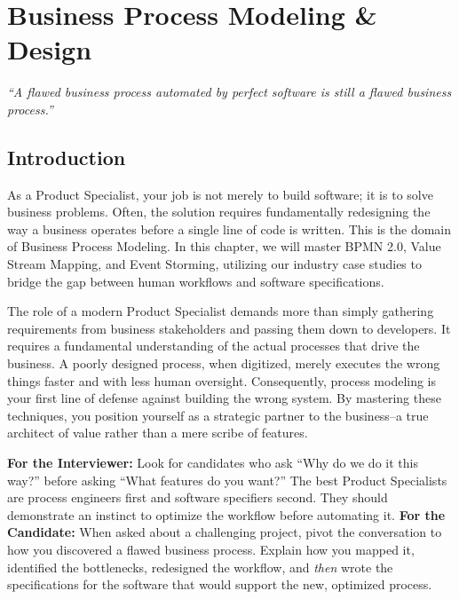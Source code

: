 \documentclass[
  11pt,
  openany,
  oneside]{book}
\renewenvironment{quote}{\begin{customquote}}{\end{customquote}}
\begin{document}
\chapter{Business Process Modeling \&
Design}\label{business-process-modeling-design}

\begin{quote}
\emph{``A flawed business process automated by perfect software is still
a flawed business process.''}
\end{quote}

\section{Introduction}\label{introduction-1}

As a Product Specialist, your job is not merely to build software; it is
to solve business problems. Often, the solution requires fundamentally
redesigning the way a business operates before a single line of code is
written. This is the domain of Business Process Modeling. In this
chapter, we will master BPMN 2.0, Value Stream Mapping, and Event
Storming, utilizing our industry case studies to bridge the gap between
human workflows and software specifications.

The role of a modern Product Specialist demands more than simply
gathering requirements from business stakeholders and passing them down
to developers. It requires a fundamental understanding of the actual
processes that drive the business. A poorly designed process, when
digitized, merely executes the wrong things faster and with less human
oversight. Consequently, process modeling is your first line of defense
against building the wrong system. By mastering these techniques, you
position yourself as a strategic partner to the business--a true
architect of value rather than a mere scribe of features.

\begin{quote}
\textbf{For the Interviewer:} Look for candidates who ask ``Why do we do
it this way?'' before asking ``What features do you want?'' The best
Product Specialists are process engineers first and software specifiers
second. They should demonstrate an instinct to optimize the workflow
before automating it. \textbf{For the Candidate:} When asked about a
challenging project, pivot the conversation to how you discovered a
flawed business process. Explain how you mapped it, identified the
bottlenecks, redesigned the workflow, and \emph{then} wrote the
specifications for the software that would support the new, optimized
process.
\end{quote}
\end{document}

